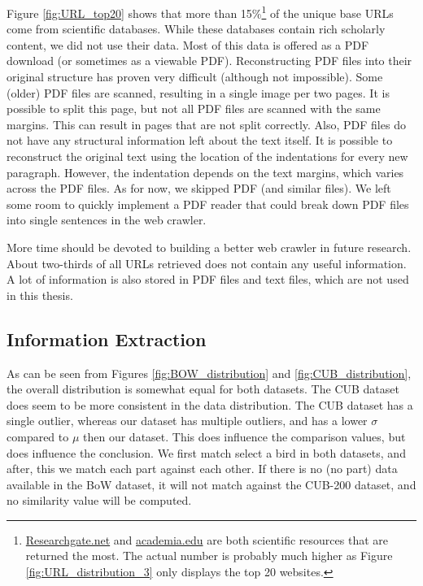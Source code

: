 \documentclass[a4paper, 12pt, oneside]{book} %
\begin{document}
Figure \ref{fig:URL_top20} shows that more than 15\%\footnote{\href{https://www.researchgate.net/}{Researchgate.net} and \href{https://www.academia.edu/}{academia.edu} are both scientific resources that are returned the most. The actual number is probably much higher as Figure \ref{fig:URL_distribution_3} only displays the top 20 websites.} of the unique base URLs come from scientific databases.
While these databases contain rich scholarly content, we did not use their data.
Most of this data is offered as a PDF download (or sometimes as a viewable PDF).
Reconstructing PDF files into their original structure has proven very difficult (although not impossible).
Some (older) PDF files are scanned, resulting in a single image per two pages. 
It is possible to split this page, but not all PDF files are scanned with the same margins. 
This can result in pages that are not split correctly.
Also, PDF files do not have any structural information left about the text itself. 
It is possible to reconstruct the original text using the location of the indentations for every new paragraph.
However, the indentation depends on the text margins, which varies across the PDF files.
As for now, we skipped PDF (and similar files). 
We left some room to quickly implement a PDF reader that could break down PDF files into single sentences in the web crawler.

More time should be devoted to building a better web crawler in future research. 
About two-thirds of all URLs retrieved does not contain any useful information.
A lot of information is also stored in PDF files and text files, which are not used in this thesis.

\subsection{Information Extraction }
As can be seen from Figures \ref{fig:BOW_distribution} and \ref{fig:CUB_distribution}, the overall distribution is somewhat equal for both datasets.
The CUB dataset does seem to be more consistent in the data distribution.
The CUB dataset has a single outlier, whereas our dataset has multiple outliers, and has a lower $\sigma$ compared to $\mu$ then our dataset.
This does influence the comparison values, but does influence the conclusion.
We first match select a bird in both datasets, and after, this we match each part against each other.
If there is no (no part) data available in the BoW dataset, it will not match against the CUB-200 dataset, and no similarity value will be computed.
\end{document}
